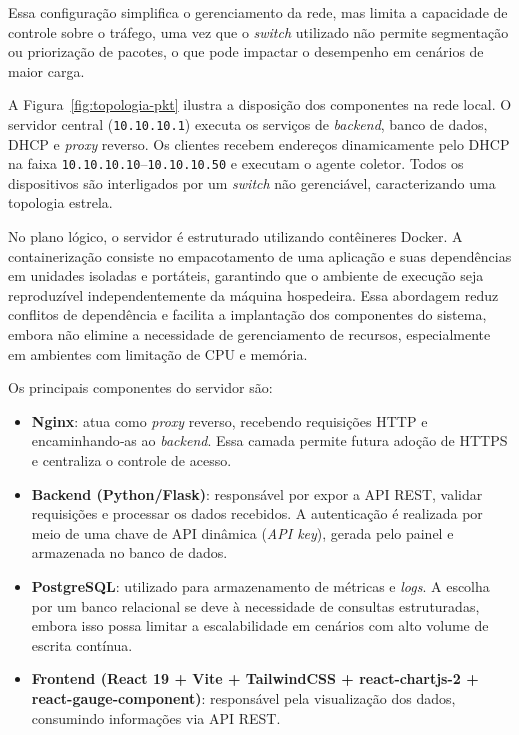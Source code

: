 \documentclass[
    12pt
    ,oneside
    ,a4paper
    ,chapter=TITLE
    ,section=TITLE
    ,sumario=abnt-6027-2012]{abntex2}
\begin{document}
Essa configuração simplifica o gerenciamento da rede, mas limita a capacidade de controle sobre o tráfego, uma vez que o \textit{switch} utilizado não permite segmentação ou priorização de pacotes, o que pode impactar o desempenho em cenários de maior carga.

A Figura~\ref{fig:topologia-pkt} ilustra a disposição dos componentes na rede local. O servidor central (\texttt{10.10.10.1}) executa os serviços de \textit{backend}, banco de dados, DHCP e \textit{proxy} reverso. Os clientes recebem endereços dinamicamente pelo DHCP na faixa \texttt{10.10.10.10}--\texttt{10.10.10.50} e executam o agente coletor. Todos os dispositivos são interligados por um \textit{switch} não gerenciável, caracterizando uma topologia estrela.

\begin{figure}[H]
\end{figure}


No plano lógico, o servidor é estruturado utilizando contêineres Docker. A containerização consiste no empacotamento de uma aplicação e suas dependências em unidades isoladas e portáteis, garantindo que o ambiente de execução seja reproduzível independentemente da máquina hospedeira. Essa abordagem reduz conflitos de dependência e facilita a implantação dos componentes do sistema, embora não elimine a necessidade de gerenciamento de recursos, especialmente em ambientes com limitação de CPU e memória.

Os principais componentes do servidor são:

\begin{itemize}
    \item \textbf{Nginx}: atua como \textit{proxy} reverso, recebendo requisições HTTP e encaminhando‑as ao \textit{backend}. Essa camada permite futura adoção de HTTPS e centraliza o controle de acesso.
    \item \textbf{Backend (Python/Flask)}: responsável por expor a API REST, validar requisições e processar os dados recebidos. A autenticação é realizada por meio de uma chave de API dinâmica (\textit{API key}), gerada pelo painel e armazenada no banco de dados.
    \item \textbf{PostgreSQL}: utilizado para armazenamento de métricas e \textit{logs}. A escolha por um banco relacional se deve à necessidade de consultas estruturadas, embora isso possa limitar a escalabilidade em cenários com alto volume de escrita contínua.
    \item \textbf{Frontend (React 19 + Vite + TailwindCSS + react-chartjs-2 + react-gauge-component)}: responsável pela visualização dos dados, consumindo informações via API REST.
\end{itemize}
\end{document}
